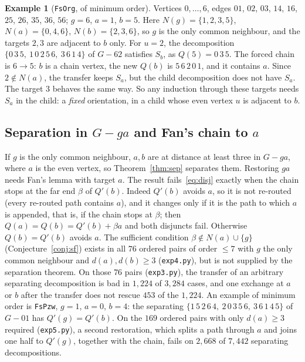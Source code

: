 \documentclass[11pt]{amsart}
\theoremstyle{definition}
\newtheorem{example}[theorem]{Example}
\begin{document}
\begin{example}[\texttt{FsOrg}, of minimum order]\label{ex:fsorg}
Vertices $0,\dots,6$, edges $01$, $02$, $03$, $14$, $16$, $25$, $26$, $35$, $36$, $56$; $g=6$, $a=1$, $b=5$. Here $N(g)=\{1,2,3,5\}$,
$N(a)=\{0,4,6\}$, $N(b)=\{2,3,6\}$, so $g$ is the only common neighbour, and the targets $2,3$ are
adjacent to $b$ only. For $u=2$, the decomposition $\{0\,3\,5,\ 1\,0\,2\,5\,6,\ 3\,6\,1\,4\}$ of
$G-62$ satisfies $S_b$, as $Q(5)=0\,3\,5$. The forced chain is $6\to5$: $b$ is a chain vertex, the
new $Q(b)$ is $5\,6\,2\,0\,1$, and it contains $a$. Since $2\notin N(a)$, the transfer keeps $S_a$, but
the child decomposition does not have $S_a$. The target $3$ behaves the same way. So any induction
through these targets needs $S_a$ in the child: a \emph{fixed} orientation, in a child whose even
vertex $u$ is adjacent to $b$.
\end{example}

\subsection{Separation in $G-ga$ and Fan's chain to $a$}
If $g$ is the only common neighbour, $a,b$ are at distance at least three in $G-ga$, where $a$ is the
even vertex, so Theorem~\ref{thm:sep} separates them. Restoring $ga$ needs Fan's lemma with target
$a$. The result fails~\eqref{eq:disj} exactly when the chain stops at the far end $\beta$ of $Q'(b)$.
Indeed $Q'(b)$ avoids $a$, so it is not re-routed (every re-routed path contains $a$), and it changes
only if it is the path to which $a$ is appended, that is, if the chain stops at $\beta$; then
$Q(a)=Q(b)=Q'(b)+\beta a$ and both disjuncts fail. Otherwise $Q(b)=Q'(b)$ avoids $a$. The
sufficient condition $\beta\notin N(a)\cup\{g\}$ (Conjecture~\ref{conj:sf}) exists in all $76$ ordered
pairs of order $\le7$ with $g$ the only common neighbour and $d(a),d(b)\ge3$ (\texttt{exp4.py}), but
is not supplied by the separation theorem. On those $76$ pairs (\texttt{exp3.py}), the transfer of an
arbitrary separating decomposition is bad in $1{,}224$ of $3{,}284$ cases, and one exchange at $a$ or
$b$ after the transfer does not rescue $453$ of the $1{,}224$. An example of minimum order is
\texttt{FsPzw}, $g=1$, $a=0$, $b=4$: the separating $\{1\,5\,2\,6\,4,\ 2\,0\,3\,5\,6,\
3\,6\,1\,4\,5\}$ of $G-01$ has $Q'(g)=Q'(b)$. On the $169$ ordered pairs with only $d(a)\ge3$
required (\texttt{exp5.py}), a second restoration, which splits a path through $a$ and joins one half
to $Q'(g)$, together with the chain, fails on $2{,}668$ of $7{,}442$ separating decompositions.
\end{document}
